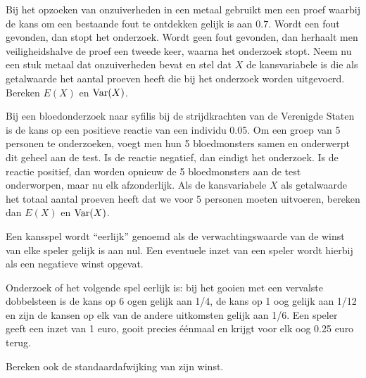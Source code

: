 \documentclass[a4paper,12pt, twoside]{article}
\begin{document}
\begin{oefening}
Bij het opzoeken van onzuiverheden in een metaal gebruikt men een proef waarbij de kans om een bestaande fout te ontdekken gelijk is aan $0.7$. Wordt een fout gevonden, dan stopt het onderzoek. Wordt geen fout gevonden, dan herhaalt men veiligheidshalve de proef een tweede keer, waarna het onderzoek stopt. Neem nu een stuk metaal dat onzuiverheden bevat en stel dat $X$ de kansvariabele is die als getalwaarde het aantal proeven heeft die bij het onderzoek worden uitgevoerd. Bereken $E(X)$ en $\Var(X)$.
\end{oefening}

\begin{oefening}
Bij een bloedonderzoek naar syfilis bij de strijdkrachten van de Verenigde Staten is de kans op een positieve reactie van een individu 0.05. Om een groep van 5 personen te onderzoeken, voegt men hun 5 bloedmonsters samen en onderwerpt dit geheel aan de test. Is de reactie negatief, dan eindigt het onderzoek. Is de reactie positief, dan worden opnieuw de 5 bloedmonsters aan de test onderworpen, maar nu elk afzonderlijk. Als de kansvariabele $X$ als getalwaarde het totaal aantal proeven heeft dat we voor 5 personen moeten uitvoeren, bereken dan $E(X)$ en $\Var(X)$.
\end{oefening}

\begin{oefening}
Een kansspel wordt “eerlijk” genoemd als de verwachtingswaarde van de winst van elke speler gelijk is aan nul. Een eventuele inzet van een speler wordt hierbij als een negatieve winst opgevat.

Onderzoek of het volgende spel eerlijk is: bij het gooien met een vervalste dobbelsteen is de kans op 6 ogen gelijk aan 1/4, de kans op 1 oog gelijk aan 1/12 en zijn de kansen op elk van de andere uitkomsten gelijk aan 1/6. Een speler geeft een inzet van 1 euro, gooit precies éénmaal en krijgt voor elk oog 0.25 euro terug.

Bereken ook de standaardafwijking van zijn winst.
\end{oefening}
\end{document}

